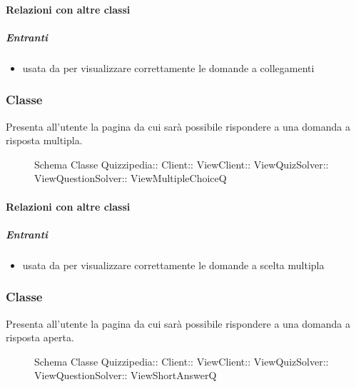\paragraph{Relazioni con altre classi}
\subparagraph{Entranti}
\begin{itemize}
\item usata da  per visualizzare correttamente le domande a collegamenti
\end{itemize}
\subsubsection{Classe }
Presenta all'utente la pagina da cui sarà possibile rispondere a una domanda a risposta multipla.
\begin{figure}[H]
\centering
\noindent{}
\caption[Schema Classe ViewMultipleChoiceQ]{Schema Classe Quizzipedia:: Client:: ViewClient:: ViewQuizSolver:: ViewQuestionSolver:: ViewMultipleChoiceQ}
\end{figure}
\paragraph{Relazioni con altre classi}
\subparagraph{Entranti}
\begin{itemize}
\item usata da  per visualizzare correttamente le domande a scelta multipla
\end{itemize}
\subsubsection{Classe }
Presenta all'utente la pagina da cui sarà possibile rispondere a una domanda a risposta aperta.
\begin{figure}[H]
\centering
\noindent{}
\caption[Schema Classe ViewShortAnswerQ]{Schema Classe Quizzipedia:: Client:: ViewClient:: ViewQuizSolver:: ViewQuestionSolver:: ViewShortAnswerQ}
\end{figure}
